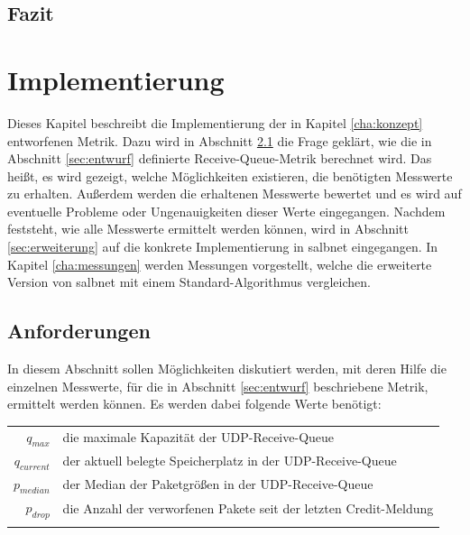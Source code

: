 \documentclass[a4paper, 12pt, BCOR10mm, DIV12, toc=bibliography, toc=listof, german]{scrbook}
\begin{document}

		\section{Fazit} %
		\label{sec:konzept-fazit}
		


	\chapter{Implementierung} %
	\label{cha:implementierung}

	Dieses Kapitel beschreibt die Implementierung der in Kapitel \ref{cha:konzept} entworfenen Metrik.
	Dazu wird in Abschnitt \ref{sec:anforderungen} die Frage geklärt, wie die in Abschnitt
	\ref{sec:entwurf} definierte Receive-Queue-Metrik berechnet wird. Das heißt, es wird gezeigt, welche
	Möglichkeiten existieren, die benötigten Messwerte zu erhalten. Außerdem werden die erhaltenen
	Messwerte bewertet und es wird auf eventuelle Probleme oder Ungenauigkeiten dieser Werte
	eingegangen. Nachdem feststeht, wie alle Messwerte ermittelt werden können, wird in Abschnitt
	\ref{sec:erweiterung} auf die konkrete Implementierung in salbnet eingegangen. In Kapitel
	\ref{cha:messungen} werden Messungen vorgestellt, welche die erweiterte Version von salbnet mit
	einem Standard-Algorithmus vergleichen.

		\section{Anforderungen} %
		\label{sec:anforderungen}

		In diesem Abschnitt sollen Möglichkeiten diskutiert werden, mit deren Hilfe die einzelnen
		Messwerte, für die in Abschnitt \ref{sec:entwurf} beschriebene Metrik, ermittelt werden können. Es
		werden dabei folgende Werte benötigt: $~$\\
		
		\begin{tabular}{rl}
			$q_{max}$		  & die maximale Kapazität der UDP-Receive-Queue\\
			$q_{current}$ &	der aktuell belegte Speicherplatz in der UDP-Receive-Queue\\
			$p_{median}$  &	der Median der Paketgrößen in der UDP-Receive-Queue\\
			$p_{drop}$    &	die Anzahl der verworfenen Pakete seit der letzten Credit-Meldung\\
										& \\
		\end{tabular}
\end{document}
